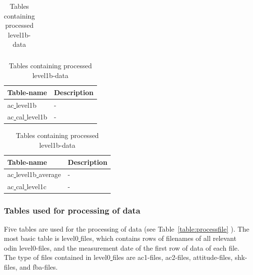 \documentclass[12pt]{article}
\begin{document}
\begin{table}[!htb]
\begin{scriptsize}
\begin{subtable}{.9\linewidth}
\begin{tabular}{ll}
        \end{tabular}
    \end{subtable}
   \newline
   \newline

 \begin{subtable}{.9\linewidth}
     \captionsetup{font=scriptsize}
       \caption{Tables containing processed level1-data}
     \label{table:level1b}
      \centering     
        \begin{tabular}{ll}
           \hline\hline
Table-name & Description\\ [0.5ex]
\hline
ac\underline{ }level1b  &  -\\
ac\underline{ }cal\underline{ }level1b  &  -\\
\hline
 
        \end{tabular}
    \end{subtable}
   \newline
\newline

 \begin{subtable}{.9\linewidth}
     \captionsetup{font=scriptsize}
      \caption{Tables containing processed level1b-data}
     \label{table:level1c}
      \centering     
        \begin{tabular}{ll}
          \hline\hline
Table-name & Description\\ [0.5ex]
\hline
ac\underline{ }level1b\underline{ }average  &  -\\
ac\underline{ }cal\underline{ }level1c  &  -\\[1ex]
\hline
  
        \end{tabular}
    \end{subtable}
 
   

 
\end{scriptsize}
\end{table}


\clearpage
\newpage

\subsubsection{Tables used for processing of data}
\label{sec:processingtables}
Five tables are used for the processing of data (see Table~\ref{table:processfile} ).
The most basic table is level0\underline{ }files, which contains
rows of filenames of all relevant odin level0-files,
and the measurement date of the first row of data of each file.
The type of files contained in level0\underline{ }files are
ac1-files, ac2-files, attitude-files, shk-files, and fba-files.
\end{document}
